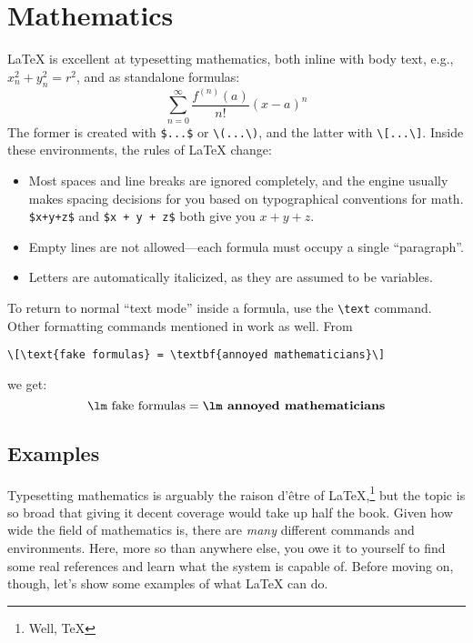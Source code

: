 \chapter{Mathematics}

\LaTeX{} is excellent at typesetting mathematics, both inline with body text,
e.g., $x_n^2+y_n^2=r^2$, and as standalone formulas:
\[\sum_{n=0}^{\infty} \frac{f^{(n)} (a)}{n!} (x - a)^n\]
The former is created with \verb|$...$| or \verb|\(...\)|,
and the latter with \verb|\[...\]|.
Inside these environments, the rules of \LaTeX{} change:
\begin{itemize}
\item Most spaces and line breaks are ignored completely,
    and the engine usually makes spacing decisions for you based on
    typographical conventions for math.
    \verb|$x+y+z$| and \verb|$x + y + z$| both give you $x+y+z$.
\item Empty lines are not allowed---each formula must occupy a single
    ``paragraph''\quotekern.
\item Letters are automatically italicized, as they are assumed to be variables.
\end{itemize}
To return to normal ``text mode'' inside a formula, use the \verb|\text| command.
Other formatting commands mentioned in  work as well.
From
\begin{leftfigure}
\begin{lstlisting}
\[\text{fake formulas} = \textbf{annoyed mathematicians}\]
\end{lstlisting}
\end{leftfigure}
we get:
\[\text{\lm fake formulas} = \textbf{\lm annoyed mathematicians}\]

\section{Examples}

Typesetting mathematics is arguably the raison d'être of
\LaTeX,\punckern\footnote{Well, \TeX} but the topic is so broad that giving
it decent coverage would take up half the book.
Given how wide the field of mathematics is,
there are \emph{many} different commands and environments.
Here, more so than anywhere else,
you owe it to yourself to find some real references and learn what the system
is capable of.
Before moving on, though, let's show some examples of what \LaTeX{}
can do.
\newpage

